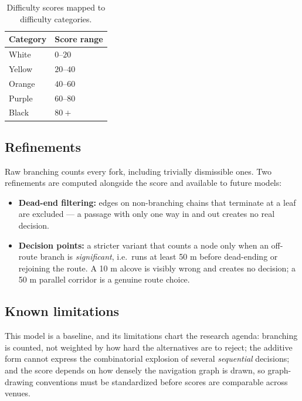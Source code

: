 \documentclass[11pt,a4paper,twocolumn]{article}
\begin{document}
\begin{table}[h]
\centering
\begin{tabular}{@{}ll@{}}
\toprule
\textbf{Category} & \textbf{Score range} \\ \midrule
White  & $0$--$20$  \\
Yellow & $20$--$40$ \\
Orange & $40$--$60$ \\
Purple & $60$--$80$ \\
Black  & $80+$      \\ \bottomrule
\end{tabular}
\caption{Difficulty scores mapped to difficulty categories.}
\label{tab:thresholds}
\end{table}

\subsection{Refinements}

Raw branching counts every fork, including trivially dismissible ones. Two
refinements are computed alongside the score and available to future models:

\begin{itemize}
    \item \textbf{Dead-end filtering:} edges on non-branching chains that
          terminate at a leaf are excluded --- a passage with only one way in
          and out creates no real decision.
    \item \textbf{Decision points:} a stricter variant that counts a node
          only when an off-route branch is \emph{significant}, i.e.\ runs at
          least 50 m before dead-ending or rejoining the route. A 10 m alcove
          is visibly wrong and creates no decision; a 50 m parallel corridor
          is a genuine route choice.
\end{itemize}

\subsection{Known limitations}

This model is a baseline, and its limitations chart the research agenda:
branching is counted, not weighted by how hard the
alternatives are to reject; the additive form cannot express the
combinatorial explosion of several \emph{sequential} decisions; and the score
depends on how densely the navigation graph is drawn, so graph-drawing
conventions must be standardized before scores are comparable across venues.
\end{document}
